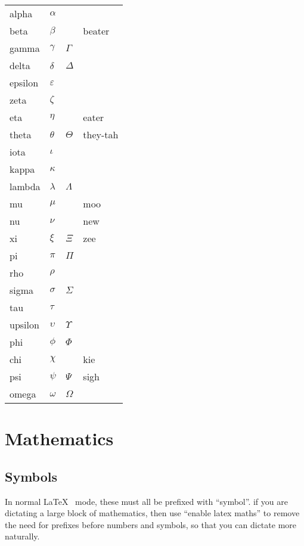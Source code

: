 \documentclass[12pt, a4paper]{article}
\begin{document}
\begin{longtable}{llll}
alpha & $\alpha$ & & \\
beta & $\beta$ &  & beater \\
gamma & $\gamma$ & $\Gamma$ & \\
delta & $\delta$ & $\Delta$ & \\
epsilon & $\varepsilon$ & & \\
zeta & $\zeta$ & & \\
eta & $\eta$ & & eater \\
theta & $\theta$ & $\Theta$ & they-tah \\
iota & $\iota$ & & \\
kappa & $\kappa$ & & \\
lambda & $\lambda$ & $\Lambda$ & \\
mu & $\mu$ & & moo \\
nu & $\nu$ & & new \\
xi & $\xi$ & $\Xi$ & zee \\
pi & $\pi$ & $\Pi$ & \\
rho & $\rho$ & & \\
sigma & $\sigma$ & $\Sigma$ & \\
tau & $\tau$ & & \\
upsilon & $\upsilon$ & $\Upsilon$ & \\
phi & $\phi$ & $\Phi$ & \\
chi & $\chi$ & & kie \\
psi & $\psi$ & $\Psi$ & sigh \\
omega & $\omega$ & $\Omega$ & \\
\end{longtable}

\section{Mathematics}
\subsection{Symbols}
In normal \LaTeX~ mode, these must all be prefixed with ``symbol''. if you are dictating a large block of mathematics, then use ``enable latex maths'' to remove the need for prefixes before numbers and symbols, so that you can dictate more naturally.
\end{document}
